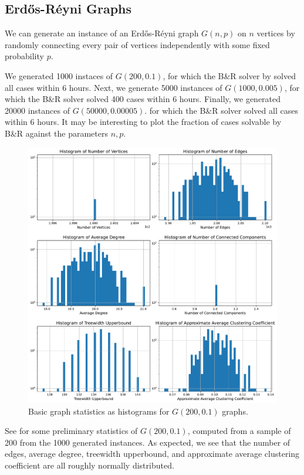\documentclass{article}
\begin{document}
\subsection{Erd\H os-R\'eyni Graphs}
We can generate an instance of an Erd\H os-R\'eyni graph $G(n, p)$ on $n$ vertices
by randomly connecting every pair of vertices independently
with some fixed probability $p$.

We generated 1000 instaces of $G(200, 0.1)$,
for which the B\&R solver by \citet{kamis} solved all cases within 6 hours.
Next, we generate 5000 instances of $G(1000, 0.005)$,
for which the B\&R solver solved 400 cases within 6 hours.
Finally, we generated 20000 instances of $G(50000, 0.00005)$.
for which the B\&R solver solved all cases within 6 hours.
It may be interesting to plot the fraction of cases solvable by B\&R
against the parameters $n, p$.

\begin{figure}
     \centering
     \includegraphics[width=\textwidth]{figures/erdos_reyni_small}
     \caption{Basic graph statistics as histograms for $G(200, 0.1)$ graphs.}
     \label{fig:erdos_reyni_small}
\end{figure}

See  for some preliminary statistics of $G(200, 0.1)$,
computed from a sample of 200 from the 1000 generated instances.
As expected,
we see that the number of edges,
average degree,
treewidth upperbound,
and approximate average clustering coefficient
are all roughly normally distributed.
\end{document}
